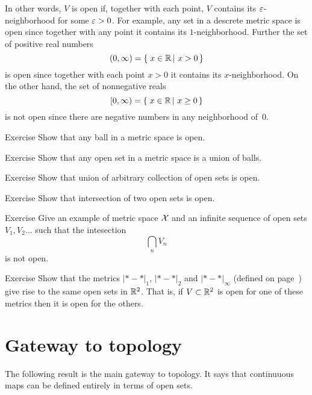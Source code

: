 In other words, $V$ is open if, together with each point, $V$ contains its $\varepsilon$-neighborhood for some $\varepsilon>0$.
For example, any set in a descrete metric space is open since together with any point it contains its $1$-neighborhood.
Further the set of positive real numbers
\[(0,\infty)=\set{x\in\RR}{x>0}\] 
is open since together with each point $x>0$ it contains its $x$-neighborhood.
On the other hand, the set of nonnegative reals 
\[[0,\infty)=\set{x\in\RR}{x\ge0}\]
is not open since there are negative numbers in any neighborhood of~$0$.

\begin{thm}{Exercise}\label{ex:ball-is-open}
Show that any ball in a metric space is open.
\end{thm}

\begin{thm}{Exercise}
Show that any  open set in a metric space is a union of balls. 
\end{thm}

\begin{thm}{Exercise}\label{ex:open-union} Show that union of arbitrary collection of open sets is open.
\end{thm}

\begin{thm}{Exercise}\label{ex:open-intersection}
Show that intersection of two open sets is open.
\end{thm}

\begin{thm}{Exercise}
Give an example of metric space $\mathcal{X}$ and an infinite sequence of open sets $V_1,V_2\dots$
such that the intesection
\[\bigcap_nV_n\]
is not open.
\end{thm}

\begin{thm}{Exercise}\label{ex:d1+d2+dinfty-open}
Show that the metrics $|{*}-{*}|_1$, $|{*}-{*}|_2$ and $|{*}-{*}|_\infty$ (defined on page~\pageref{page:Metrics on the plane})
give rise to the same open sets in $\mathbb{R}^2$.
That is, if $V\subset \mathbb{R}^2$ is open for one of these metrics then it is open for the others.
\end{thm}

\section{Gateway to topology}

The following result is the main gateway to topology.
It says that continuuous maps can be defined entirely in terms of open sets.

